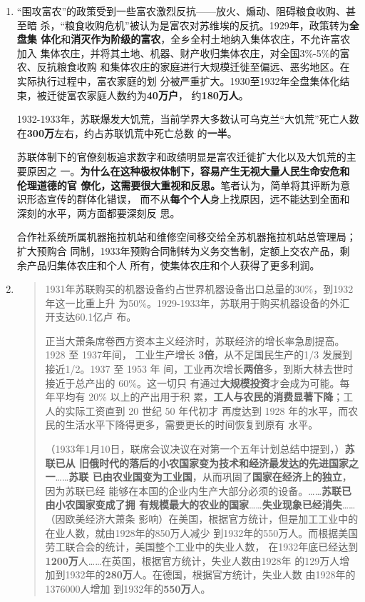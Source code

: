 \begin{enumerate}

\item ``围攻富农''的政策受到一些富农激烈反抗——放火、煽动、阻碍粮食收购、甚至暗
  杀，``粮食收购危机''被认为是富农对苏维埃的反抗。1929年，政策转为\textbf{全盘集
    体化}和\textbf{消灭作为阶级的富农}，全乡全村土地纳入集体农庄，不允许富农加入
  集体农庄，并将其土地、机器、财产收归集体农庄，对全国3\%-5\%的富农、反抗粮食收购
  和集体农庄的家庭进行大规模迁徙至偏远、恶劣地区。在实际执行过程中，富农家庭的划
  分被严重扩大。1930至1932年全盘集体化结束，被迁徙富农家庭人数约为\textbf{40万户}，
  约\textbf{180万人}。\cite{xulongbinsu}

  1932-1933年，苏联爆发大饥荒，当前学界大多数认可乌克兰``大饥荒''死亡人数
  在\textbf{300万}左右，约占苏联饥荒中死亡总数
  的\textbf{一半}。\cite{wukelanjihuang}

  苏联体制下的官僚刻板追求数字和政绩明显是富农迁徙扩大化以及大饥荒的主要原因之
  一。\textbf{为什么在这种极权体制下，容易产生无视大量人民生命安危和伦理道德的官
    僚化，这需要很大重视和反思。}笔者认为，简单将其评断为意识形态宣传的群体化错误，
  而不从\textbf{每个个人}身上找原因，远不能达到全面和深刻的水平，两方面都要深刻反
  思。

  合作社系统所属机器拖拉机站和维修空间移交给全苏机器拖拉机站总管理局；扩大预购合
  同制，1933年预购合同制转为义务交售制，定额上交农产品，剩余产品归集体农庄和个人
  所有，使集体农庄和个人获得了更多利润。

\item
  \begin{quotation}
    1931年苏联购买的机器设备约占世界机器设备出口总量的30\%，到1932年这一比重上升
    为50\%。1929-1933年，苏联用于购买机器设备的外汇开支达60.1亿卢
    布。

    正当大萧条席卷西方资本主义经济时，苏联经济的增长率急剧提高。 1928 至 1937年间，
    工业生产增长 \textbf{3倍}，从不足国民生产的1/3 发展到接近1/2。1937 至 1953 年
    间，工业再次增长\textbf{两倍}多，到斯大林去世时接近于总产出的 60\%。这一切只
    有通过\textbf{大规模投资}才会成为可能。每年平均有 20\% 以上的产出用于积
    累，\textbf{工人与农民的消费显著下降}；工人的实际工资直到 20 世纪 50 年代初才
    再度达到 1928 年的水平，而农民的生活水平下降得更多，需要更长的时间恢复到原有
    水平。

    （1933年1月10日，联席会议决议在对第一个五年计划总结中提到，）\textbf{苏联已从
      旧俄时代的落后的小农国家变为技术和经济最发达的先进国家之一}……\textbf{苏联
      已由农业国变为工业国}，从而巩固了\textbf{国家在经济上的独立}，因为苏联已经
    能够在本国的企业内生产大部分必须的设备。……\textbf{苏联已由小农国家变成了拥
      有规模最大的农业的国家}……\textbf{失业现象已经消失}……（因欧美经济大萧条
    影响）在美国，根据官方统计，但是加工工业中的在业人数，就由1928年的850万人减少
    到1932年的550万人。而根据美国劳工联合会的统计，美国整个工业中的失业人数，
    在1932年底已经达到\textbf{1200万}人……在英国，根据官方统计，失业人数由1928年
    的129万人增加到1932年的\textbf{280万}人。在德国，根据官方统计，失业人数
    由1928年的1376000人增加
    到1932年的\textbf{550万}人。
    

\end{quotation}
\end{enumerate}

